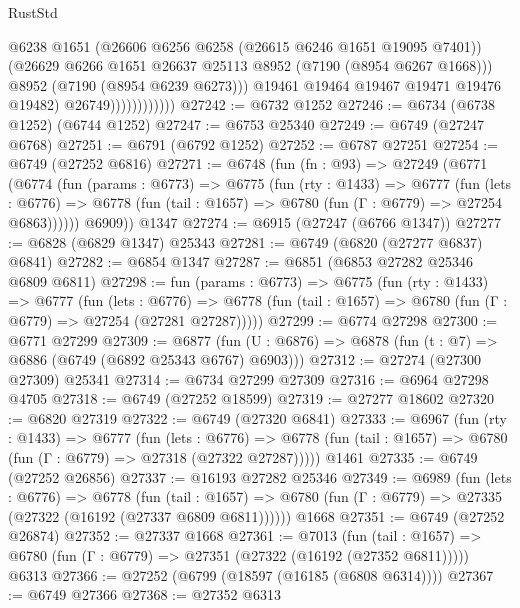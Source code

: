 \begin{lexlean}{RustStd}
\begin{coremodule}
                                @6238
                                @1651
                                (@26606 @6256 @6258 (@26615 @6246 @1651 @19095 @7401))
                                (@26629 @6266 @1651 @26637 @25113 @8952 (@7190 (@8954 @6267 @1668)))
                                @8952
                                (@7190 (@8954 @6239 @6273)))
                              @19461
                              @19464
                              @19467
                              @19471
                              @19476
                              @19482)
                            @26749))))))))))))
@27242 := @6732 @1252
@27246 := @6734 (@6738 @1252) (@6744 @1252)
@27247 := @6753 @25340
@27249 := @6749 (@27247 @6768)
@27251 := @6791 (@6792 @1252)
@27252 := @6787 @27251
@27254 := @6749 (@27252 @6816)
@27271 := @6748
    (fun (fn : @93) =>
    @27249
      (@6771
        (@6774
          (fun (params : @6773) =>
          @6775
            (fun (rty : @1433) =>
            @6777
              (fun (lets : @6776) =>
              @6778 (fun (tail : @1657) => @6780 (fun (Γ : @6779) => @27254 @6863))))))
        @6909))
    @1347
@27274 := @6915 (@27247 (@6766 @1347))
@27277 := @6828 (@6829 @1347) @25343
@27281 := @6749 (@6820 (@27277 @6837) @6841)
@27282 := @6854 @1347
@27287 := @6851 (@6853 @27282 @25346 @6809 @6811)
@27298 := fun (params : @6773) =>
  @6775
    (fun (rty : @1433) =>
    @6777
      (fun (lets : @6776) =>
      @6778 (fun (tail : @1657) => @6780 (fun (Γ : @6779) => @27254 (@27281 @27287)))))
@27299 := @6774 @27298
@27300 := @6771 @27299
@27309 := @6877
    (fun (U : @6876) => @6878 (fun (t : @7) => @6886 (@6749 (@6892 @25343 @6767) @6903)))
@27312 := @27274 (@27300 @27309) @25341
@27314 := @6734 @27299 @27309
@27316 := @6964 @27298 @4705
@27318 := @6749 (@27252 @18599)
@27319 := @27277 @18602
@27320 := @6820 @27319
@27322 := @6749 (@27320 @6841)
@27333 := @6967
    (fun (rty : @1433) =>
    @6777
      (fun (lets : @6776) =>
      @6778 (fun (tail : @1657) => @6780 (fun (Γ : @6779) => @27318 (@27322 @27287)))))
    @1461
@27335 := @6749 (@27252 @26856)
@27337 := @16193 @27282 @25346
@27349 := @6989
    (fun (lets : @6776) =>
    @6778
      (fun (tail : @1657) =>
      @6780 (fun (Γ : @6779) => @27335 (@27322 (@16192 (@27337 @6809 @6811))))))
    @1668
@27351 := @6749 (@27252 @26874)
@27352 := @27337 @1668
@27361 := @7013
    (fun (tail : @1657) => @6780 (fun (Γ : @6779) => @27351 (@27322 (@16192 (@27352 @6811)))))
    @6313
@27366 := @27252 (@6799 (@18597 (@16185 (@6808 @6314))))
@27367 := @6749 @27366
@27368 := @27352 @6313

\end{coremodule}
\end{lexlean}
